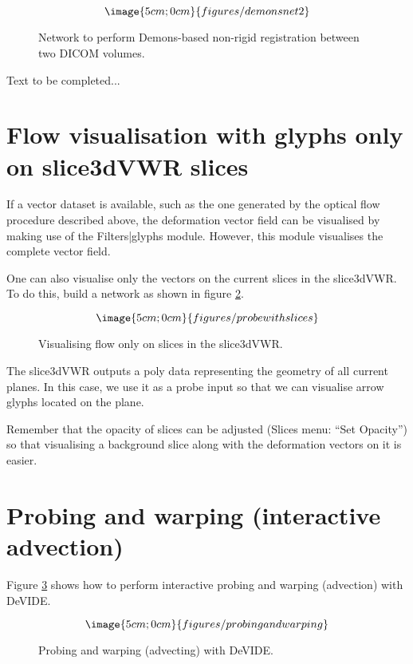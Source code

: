 \begin{figure}
$$\image{5cm;0cm}{figures/demonsnet2}$$
\caption{Network to perform Demons-based non-rigid registration between two 
DICOM volumes.}\label{figdemons}
\end{figure}

Text to be completed...

\section{Flow visualisation with glyphs only on slice3dVWR slices}

If a vector dataset is available, such as the one generated by the
optical flow procedure described above, the deformation vector field
can be visualised by making use of the Filters|glyphs module.
However, this module visualises the complete vector field.

One can also visualise only the vectors on the current slices in the
slice3dVWR.  To do this, build a network as shown in figure
\ref{figprobewithslices}.

\begin{figure}
$$\image{5cm;0cm}{figures/probewithslices}$$
\caption{Visualising flow only on slices in the slice3dVWR.}\label{figprobewithslices}
\end{figure}

The slice3dVWR outputs a poly data representing the geometry of all
current planes.  In this case, we use it as a probe input so that we
can visualise arrow glyphs located on the plane.

Remember that the opacity of slices can be adjusted (Slices menu:
``Set Opacity'') so that visualising a background slice along with the
deformation vectors on it is easier.

\section{Probing and warping (interactive advection)}
Figure \ref{figPAW} shows how to perform interactive probing and
warping (advection) with DeVIDE.

\begin{figure}
$$\image{5cm;0cm}{figures/probingandwarping}$$
\caption{Probing and warping (advecting) with DeVIDE.}\label{figPAW}
\end{figure}

